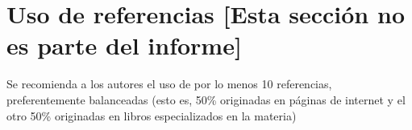 \documentclass[conference]{IEEEtran}
\begin{document}
\section*{Uso de referencias [Esta sección no es parte del informe]}

Se recomienda a los autores el uso de por lo menos 10 referencias, preferentemente balanceadas (esto es, 50\% originadas en páginas de internet y el otro 50\% originadas en libros especializados en la materia)

\printbibliography
\end{document}

